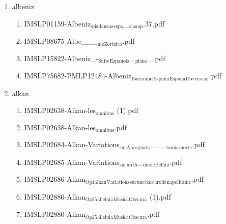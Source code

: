 \documentclass[11pt]{article}
\begin{document}
\begin{enumerate}
\item albeniz
\label{sec-1-1-1-1-44-3}
\begin{enumerate}
\item IMSLP01159-Albeniz$_{\text{seis}}$$_{\text{danzas}}$$_{\text{espa}}$\_$_{\text{olas}}$$_{\text{op}}$.37.pdf
\label{sec-1-1-1-1-44-3-1}

\item IMSLP08675-Albe\_\_\_$_{\text{niz}}$$_{\text{Zortzico}}$.pdf
\label{sec-1-1-1-1-44-3-2}

\item IMSLP15822-Albeniz\_-$_{\text{Suite}}$$_{\text{Espanola}}$\_$_{\text{piano}}$\_.pdf
\label{sec-1-1-1-1-44-3-3}

\item IMSLP75682-PMLP12484-Albeniz$_{\text{Iberia}}$$_{\text{und}}$$_{\text{Espana}}$$_{\text{Espana}}$$_{\text{Dover}}$$_{\text{scan}}$.pdf
\label{sec-1-1-1-1-44-3-4}
\end{enumerate}

\item alkan
\label{sec-1-1-1-1-44-4}
\begin{enumerate}
\item IMSLP02638-Alkan-les$_{\text{omnibus}}$ (1).pdf
\label{sec-1-1-1-1-44-4-1}

\item IMSLP02638-Alkan-les$_{\text{omnibus}}$.pdf
\label{sec-1-1-1-1-44-4-2}

\item IMSLP02684-Alkan-Variations$_{\text{sur}}$$_{\text{Ah}}$$_{\text{segnata}}$\_\_\_$_{\text{la}}$$_{\text{mia}}$$_{\text{morte}}$.pdf
\label{sec-1-1-1-1-44-4-3}

\item IMSLP02685-Alkan-Variations$_{\text{sur}}$$_{\text{un}}$$_{\text{th}}$\_$_{\text{me}}$$_{\text{de}}$$_{\text{Bellini}}$.pdf
\label{sec-1-1-1-1-44-4-4}

\item IMSLP02686-Alkan$_{\text{Op1alkan}}$$_{\text{Variations}}$$_{\text{sur}}$$_{\text{une}}$$_{\text{barcarolle}}$$_{\text{napolitaine}}$.pdf
\label{sec-1-1-1-1-44-4-5}

\item IMSLP02880-Alkan$_{\text{Op25}}$$_{\text{alleluia}}$$_{\text{MusicaObscura}}$ (1).pdf
\label{sec-1-1-1-1-44-4-6}

\item IMSLP02880-Alkan$_{\text{Op25}}$$_{\text{alleluia}}$$_{\text{MusicaObscura}}$.pdf
\label{sec-1-1-1-1-44-4-7}


\end{enumerate}
\end{enumerate}
\end{document}

